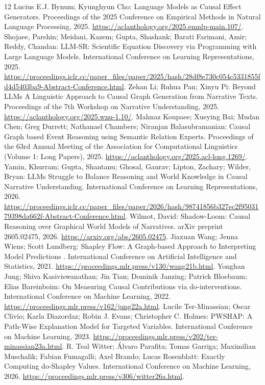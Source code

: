 \documentclass{svproc}
\begin{document}
\clearpage
\begin{thebibliography}{12}
 Lucius E.J. Bynum; Kyunghyun Cho: Language Models as Causal Effect Generators. Proceedings of the 2025 Conference on Empirical Methods in Natural Language Processing, 2025. \url{https://aclanthology.org/2025.emnlp-main.107/}.
 Shojaee, Parshin; Meidani, Kazem; Gupta, Shashank; Barati Farimani, Amir; Reddy, Chandan: LLM-SR: Scientific Equation Discovery via Programming with Large Language Models. International Conference on Learning Representations, 2025. \url{https://proceedings.iclr.cc/paper_files/paper/2025/hash/28df8e730c054c5331855fd4d5403ba9-Abstract-Conference.html}.
 Zehan Li; Ruhua Pan; Xinyu Pi: Beyond LLMs A Linguistic Approach to Causal Graph Generation from Narrative Texts. Proceedings of the 7th Workshop on Narrative Understanding, 2025. \url{https://aclanthology.org/2025.wnu-1.10/}.
 Mahnaz Koupaee; Xueying Bai; Mudan Chen; Greg Durrett; Nathanael Chambers; Niranjan Balasubramanian: Causal Graph based Event Reasoning using Semantic Relation Experts. Proceedings of the 63rd Annual Meeting of the Association for Computational Linguistics (Volume 1: Long Papers), 2025. \url{https://aclanthology.org/2025.acl-long.1269/}.
 Yamin, Khurram; Gupta, Shantanu; Ghosal, Gaurav; Lipton, Zachary; Wilder, Bryan: LLMs Struggle to Balance Reasoning and World Knowledge in Causal Narrative Understanding. International Conference on Learning Representations, 2026. \url{https://proceedings.iclr.cc/paper_files/paper/2026/hash/98741856b327ec2f9503179398da662f-Abstract-Conference.html}.
 Wilmot, David: Shadow-Loom: Causal Reasoning over Graphical World Models of Narratives. arXiv preprint 2605.02475, 2026. \url{https://arxiv.org/abs/2605.02475}.
 Jiaxuan Wang; Jenna Wiens; Scott Lundberg:  Shapley Flow: A Graph-based Approach to Interpreting Model Predictions . International Conference on Artificial Intelligence and Statistics, 2021. \url{https://proceedings.mlr.press/v130/wang21b.html}.
 Yonghan Jung; Shiva Kasiviswanathan; Jin Tian; Dominik Janzing; Patrick Bloebaum; Elias Bareinboim: On Measuring Causal Contributions via do-interventions. International Conference on Machine Learning, 2022. \url{https://proceedings.mlr.press/v162/jung22a.html}.
 Lucile Ter-Minassian; Oscar Clivio; Karla Diazordaz; Robin J. Evans; Christopher C. Holmes: PWSHAP: A Path-Wise Explanation Model for Targeted Variables. International Conference on Machine Learning, 2023. \url{https://proceedings.mlr.press/v202/ter-minassian23a.html}.
 R. Teal Witter; Álvaro Parafita; Tomas Garriga; Maximilian Muschalik; Fabian Fumagalli; Axel Brando; Lucas Rosenblatt: Exactly Computing do-Shapley Values. International Conference on Machine Learning, 2026. \url{https://proceedings.mlr.press/v306/witter26a.html}.
\end{thebibliography}
\end{document}
